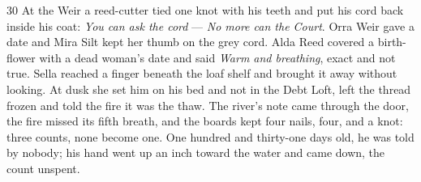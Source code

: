 \begin{CRchronicle}{30}
At the Weir a reed-cutter tied one knot with his teeth and put his cord back inside his coat: \emph{You can ask the cord} --- \emph{No more can the Court}. Orra Weir gave a date and Mira Silt kept her thumb on the grey cord. Alda Reed covered a birth-flower with a dead woman’s date and said \emph{Warm and breathing}, exact and not true. Sella reached a finger beneath the loaf shelf and brought it away without looking. At dusk she set him on his bed and not in the Debt Loft, left the thread frozen and told the fire it was the thaw. The river’s note came through the door, the fire missed its fifth breath, and the boards kept four nails, four, and a knot: three counts, none become one. One hundred and thirty-one days old, he was told by nobody; his hand went up an inch toward the water and came down, the count unspent.
\end{CRchronicle}

